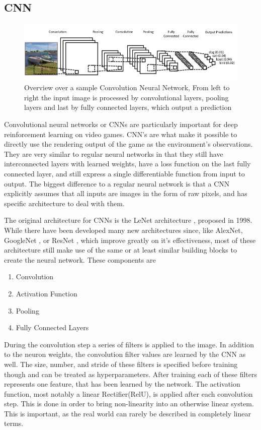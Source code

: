 \subsection{CNN}
\label{sec:cnn}
\begin{figure}[htb]
  \centering
      \includegraphics[width=1\textwidth]{Figures/cnn.png}
  \caption{ Overview over a sample Convolution Neural Network, From left to right the input image is processed by convolutional layers, pooling layers and last by fully connected layers, which output a prediction}
\end{figure}
Convolutional neural networks or CNNs are particularly important for deep reinforcement learning on video games. CNN's are what make it possible to directly use the rendering output of the game as the environment's observations. They are very similar to regular neural networks in that they still have interconnected layers with learned weights, have a loss function on the last fully connected layer, and still express a single differentiable function from input to output. The biggest difference to a regular neural network is that a CNN explicitly assumes that all inputs are images in the form of raw pixels, and has specific architecture to deal with them.

The original architecture for CNNs is the LeNet architecture \citep{leCun}, proposed in 1998. 
While there have been developed many new architectures since, like AlexNet\citep{alexnet}, GoogleNet \citep{googlenet}, or ResNet \citep{DBLP:journals/corr/HeZRS15}, which improve greatly on it's effectiveness, most of these architecture still make use of the same or at least similar building blocks to create the neural network.   
These components are

\begin{enumerate}
\item Convolution
\item Activation Function
\item Pooling
\item Fully Connected Layers
\end{enumerate}

During the convolution step a series of filters is applied to the image. In addition to the neuron weights, the convolution filter values are learned by the CNN as well. The size, number, and stride of these filters is specified before training though and can be treated as hyperparameters. After training each of these filters represents one feature, that has been learned by the network.
The activation function, most notably a linear Rectifier(RelU), is applied after each convolution step. This is done in order to bring non-linearity into an otherwise linear system. This is important, as the real world can rarely be described in completely linear terms.

